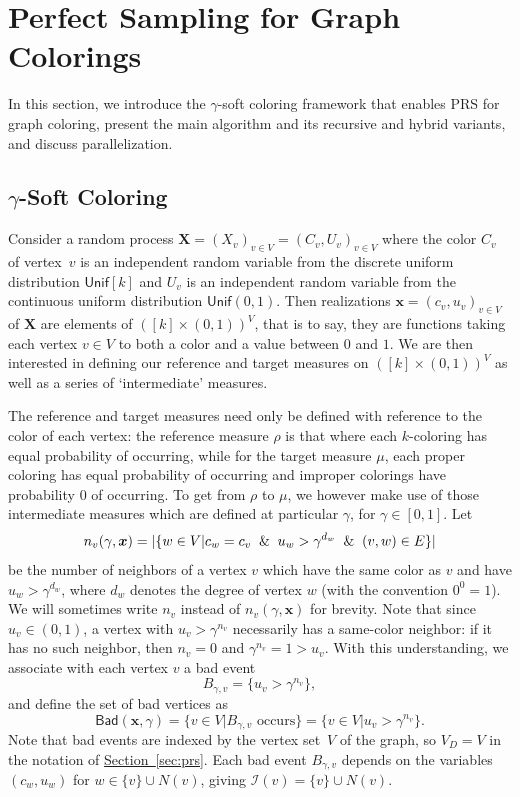 \documentclass[12pt, a4paper]{article}
\theoremstyle{plain}
\theoremstyle{definition}
\theoremstyle{remark}
\newcommand{\mc}{\mathcal}
\renewcommand{\v}[1]{\boldsymbol{#1}}
\newcommand{\mx}{\v{x}}
\newcommand{\mX}{\v{X}}
\newcommand{\sref}[2]{\hyperref[#2]{#1~\ref*{#2}}}
\newcommand{\unif}{\mathsf{Unif}}
\newcommand{\bad}{\mathsf{Bad}}
\begin{document}
\section{Perfect Sampling for Graph Colorings}\label{sec:prs-gamma}

In this section, we introduce the \(\gamma\)-soft coloring framework that enables PRS for graph coloring, present the main algorithm and its recursive and hybrid variants, and discuss parallelization.

\subsection{\texorpdfstring{\(\gamma\)}{gamma}-Soft Coloring}\label{sec:soft-coloring}

Consider a random process \(\mX=(X_v)_{v\in V}=(C_v,U_v)_{v\in V}\) where the color \(C_v\) of vertex~\(v\) is an independent random variable from the discrete uniform distribution \(\unif[k]\) and \(U_v\) is an independent random variable from the continuous uniform distribution \(\unif(0,1)\). Then realizations \(\mx=(c_v,u_v)_{v\in V}\) of \(\mX\) are elements of \(([k]\times \left(0,1\right))^V \), that is to say, they are functions taking each vertex \(v\in V\) to both a color and a value between \(0\) and \(1\). We are then interested in defining our reference and target measures on \(([k]\times \left(0,1\right))^V \) as well as a series of `intermediate' measures.

The reference and target measures need only be defined with reference to the color of each vertex: the reference measure \(\rho\) is that where each \(k\)-coloring has equal probability of occurring, while for the target measure \(\mu\), each proper coloring has equal probability of occurring and improper colorings have probability \(0\) of occurring. To get from \(\rho\) to \(\mu\), we however make use of those intermediate measures which are defined at particular \(\gamma\), for \(\gamma\in[0,1]\). Let 
\[
n_v(\gamma, \mx) = |\{w \in V | c_w = c_v\And u_w > \gamma^{d_w} \And (v,w)\in E\}|
\] 
be the number of neighbors of a vertex \(v\) which have the same color as \(v\) and have \(u_w>\gamma^{d_w}\), where \(d_w\) denotes the degree of vertex \(w\) (with the convention \(0^0=1\)). We will sometimes write \(n_v\) instead of \(n_v(\gamma,\mx)\) for brevity. Note that since \(u_v \in (0,1)\), a vertex with \(u_v>\gamma^{n_v}\) necessarily has a same-color neighbor: if it has no such neighbor, then \(n_v=0\) and \(\gamma^{n_v}=1>u_v\).
With this understanding, we associate with each vertex \(v\) a bad event
\[
B_{\gamma,v} = \{u_v>\gamma^{n_v}\},
\]
and define the set of bad vertices as
\[
\bad(\mx, \gamma)=\{v\in V\big|B_{\gamma,v}\text{ occurs}\} = \{v\in V\big|u_v>\gamma^{n_v}\}.
\]
Note that bad events are indexed by the vertex set~\(V\) of the graph, so \(V_D = V\) in the notation of \sref{Section}{sec:prs}. Each bad event \(B_{\gamma,v}\) depends on the variables \((c_w,u_w)\) for \(w\in\{v\}\cup N(v)\), giving \(\mc I(v) = \{v\}\cup N(v)\).
\end{document}
